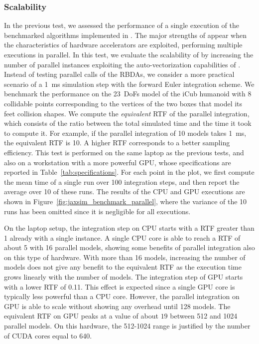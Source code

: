 \subsubsection{Scalability}

In the previous test, we assessed the performance of a single execution of the benchmarked algorithms implemented in \jaxsim.
The major strengths of \jaxsim appear when the characteristics of hardware accelerators are exploited, performing multiple executions in parallel.
In this test, we evaluate the scalability of \jaxsim by increasing the number of parallel instances exploiting the auto-vectorization capabilities of \jax.
Instead of testing parallel calls of the \acp{RBDA}, we consider a more practical scenario of a 1~ms simulation step with the forward Euler integration scheme.
We benchmark the performance on the 23~\acp{DoF} model of the iCub humanoid with 8 collidable points corresponding to the vertices of the two boxes that model its feet collision shapes.
We compute the \emph{equivalent} \ac{RTF} of the parallel integration, which consists of the ratio between the total simulated time and the time it took to compute it.
For example, if the parallel integration of 10 models takes 1~ms, the equivalent \ac{RTF} is 10.
A higher \ac{RTF} corresponds to a better sampling efficiency.
This test is performed on the same laptop as the previous tests, and also on a workstation with a more powerful \ac{GPU}, whose specifications are reported in Table~\ref{tab:specifications}.
For each point in the plot, we first compute the mean time of a single run over 100 integration steps, and then report the average over 10 of these runs.
The results of the \ac{CPU} and \ac{GPU} executions are shown in Figure~\ref{fig:jaxsim_benchmark_parallel}, where the variance of the 10 runs has been omitted since it is negligible for all executions.

On the laptop setup, the integration step on \ac{CPU} starts with a \ac{RTF} greater than 1 already with a single instance.
A single \ac{CPU} core is able to reach a \ac{RTF} of about 5 with 16 parallel models, showing some benefits of parallel integration also on this type of hardware.
With more than 16 models, increasing the number of models does not give any benefit to the equivalent \ac{RTF} as the execution time grows linearly with the number of models.
The integration step of \ac{GPU} starts with a lower \ac{RTF} of 0.11.
This effect is expected since a single \ac{GPU} core is typically less powerful than a \ac{CPU} core.
However, the parallel integration on \ac{GPU} is able to scale without showing any overhead until 128 models.
The equivalent \ac{RTF} on \ac{GPU} peaks at a value of about $19$ between 512 and 1024 parallel models.
On this hardware, the 512-1024 range is justified by the number of CUDA cores equal to 640.

